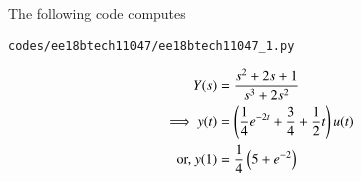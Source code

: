 \begin{enumerate}[label=\thesubsection.\arabic*.,ref=\thesubsection.\theenumi]
%
The following code computes 
\begin{lstlisting}
codes/ee18btech11047/ee18btech11047_1.py
\end{lstlisting}
\begin{align}
{Y}(s)&=\frac{s^{2}+2s+1}{s^{3}+2s^{2}}
\\
\implies y(t)&=\left(\frac{1}{4}e^{-2t}+\frac{3}{4}+\frac{1}{2}t\right)u(t)
\\
\text{or, } y(1) &= \frac{1}{4}\left(5 + e^{-2}\right)
\end{align}
\end{enumerate}
